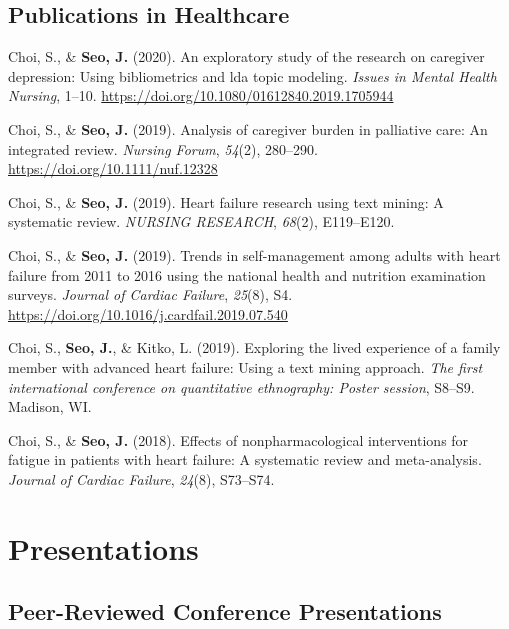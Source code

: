 \documentclass[11pt, a4paper]{awesome-cv}
\begin{document}
\hypertarget{publications-in-healthcare}{%
\subsection{Publications in
Healthcare}\label{publications-in-healthcare}}

\hypertarget{refs_healthcare}{}
\leavevmode\hypertarget{ref-doi:10.1080ux2f01612840.2019.1705944}{}%
Choi, S., \& \textbf{Seo, J.} (2020). An exploratory study of the
research on caregiver depression: Using bibliometrics and lda topic
modeling. \emph{Issues in Mental Health Nursing}, 1--10.
\url{https://doi.org/10.1080/01612840.2019.1705944}

\leavevmode\hypertarget{ref-doi:10.1111ux2fnuf.12328}{}%
Choi, S., \& \textbf{Seo, J.} (2019). Analysis of caregiver burden in
palliative care: An integrated review. \emph{Nursing Forum},
\emph{54}(2), 280--290. \url{https://doi.org/10.1111/nuf.12328}

\leavevmode\hypertarget{ref-choi2019heart}{}%
Choi, S., \& \textbf{Seo, J.} (2019). Heart failure research using text
mining: A systematic review. \emph{NURSING RESEARCH}, \emph{68}(2),
E119--E120.

\leavevmode\hypertarget{ref-choi2019trends}{}%
Choi, S., \& \textbf{Seo, J.} (2019). Trends in self-management among
adults with heart failure from 2011 to 2016 using the national health
and nutrition examination surveys. \emph{Journal of Cardiac Failure},
\emph{25}(8), S4. \url{https://doi.org/10.1016/j.cardfail.2019.07.540}

\leavevmode\hypertarget{ref-choi2019exploring}{}%
Choi, S., \textbf{Seo, J.}, \& Kitko, L. (2019). Exploring the lived
experience of a family member with advanced heart failure: Using a text
mining approach. \emph{The first international conference on
quantitative ethnography: Poster session}, S8--S9. Madison, WI.

\leavevmode\hypertarget{ref-choi2018effects}{}%
Choi, S., \& \textbf{Seo, J.} (2018). Effects of nonpharmacological
interventions for fatigue in patients with heart failure: A systematic
review and meta-analysis. \emph{Journal of Cardiac Failure},
\emph{24}(8), S73--S74.

\hypertarget{presentations}{%
\section{Presentations}\label{presentations}}

\hypertarget{peer-reviewed-conference-presentations}{%
\subsection{Peer-Reviewed Conference
Presentations}\label{peer-reviewed-conference-presentations}}
\end{document}
